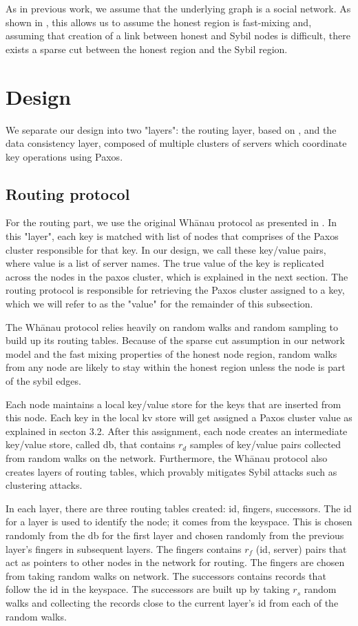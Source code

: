 \documentclass[letter]{article}
\begin{document}
As in previous work, we assume that the underlying graph is a social network.
As shown in \cite{whanau}, this allows us to assume the honest region is
fast-mixing and, assuming that creation of a link between honest and Sybil
nodes is difficult, there exists a sparse cut between the honest region
and the Sybil region.


\section{Design}

We separate our design into two "layers": the routing layer, based on
\cite{whanau}, and the data consistency layer, composed of multiple clusters of
servers which coordinate key operations using Paxos.

\subsection{Routing protocol}
For the routing part, we use the original Wh\={a}nau protocol as presented in \cite{whanau}. In this "layer", each key is matched with list of nodes that comprises of the Paxos cluster responsible for that key. In our design, we call these key/value pairs, where value is a list of server names. The true value of the key is replicated across the nodes in the paxos cluster, which is explained in the next section. The routing protocol is responsible for retrieving the Paxos cluster assigned to a key, which we will refer to as the "value" for the remainder of this subsection.

The Wh\={a}nau protocol relies heavily on random walks and random sampling to build up its routing tables.
Because of the sparse cut assumption in our network model
and the fast mixing properties of the honest node region,
random walks from any node are likely to stay within the honest region
unless the node is part of the sybil edges.

Each node maintains a local key/value store for the keys that are inserted from this node. Each key in the local kv store will get assigned a Paxos cluster value as explained in secton 3.2.
After this assignment, each node creates an intermediate key/value store, called db, that contains $r_d$ samples of key/value pairs collected from random walks on the network.
Furthermore, the Wh\={a}nau protocol also creates layers of routing tables, which provably mitigates Sybil attacks \cite{whanau} such as clustering attacks.

In each layer, there are three routing tables created: id, fingers, successors.
The id for a layer is used to identify the node; it comes from the keyspace. This is chosen randomly from the db for the first layer and chosen randomly from the previous layer's fingers in subsequent layers.
The fingers contains $r_{f}$ (id, server) pairs that act as pointers to other nodes in the network for routing. The fingers are chosen from taking random walks on network.
The successors contains records that follow the id in the keyspace. The successors are built up by taking $r_{s}$ random walks and collecting the records close to the current layer's id from each of the random walks.
\end{document}
